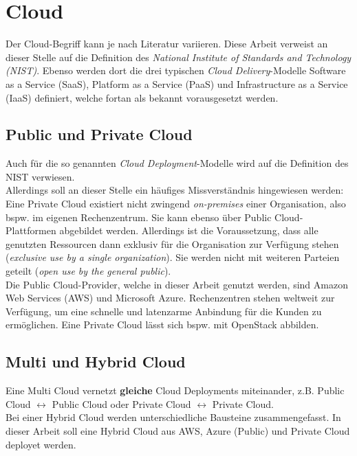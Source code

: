 \section{Cloud}\label{cloud}
Der Cloud-Begriff kann je nach Literatur variieren. Diese Arbeit verweist an dieser Stelle auf die Definition des \textit{National Institute of Standards and Technology (NIST)}. Ebenso werden dort die drei typischen \textit{Cloud Delivery}-Modelle Software as a Service (SaaS), Platform as a Service (PaaS) und Infrastructure as a Service (IaaS) definiert, welche fortan als bekannt vorausgesetzt werden.\cite{mell2011}

\subsection{Public und Private Cloud}
Auch für die so genannten \textit{Cloud Deployment}-Modelle wird auf die Definition des NIST verwiesen.\cite{mell2011}\\
Allerdings soll an dieser Stelle ein häufiges Missverständnis hingewiesen werden: Eine Private Cloud existiert nicht zwingend \textit{on-premises} einer Organisation, also bspw. im eigenen Rechenzentrum. Sie kann ebenso über Public Cloud-Plattformen abgebildet werden. Allerdings ist die Voraussetzung, dass alle genutzten Ressourcen dann exklusiv für die Organisation zur Verfügung stehen (\textit{exclusive use by a single organization}). Sie werden nicht mit weiteren Parteien geteilt (\textit{open use by the general public}).\\
Die Public Cloud-Provider, welche in dieser Arbeit genutzt werden, sind Amazon Web Services (AWS) und Microsoft Azure. Rechenzentren stehen weltweit zur Verfügung, um eine schnelle und latenzarme Anbindung für die Kunden zu ermöglichen. Eine Private Cloud lässt sich bspw. mit OpenStack abbilden\cite{sefraoui2012openstack}.

\subsection{Multi und Hybrid Cloud}
Eine Multi Cloud vernetzt \textbf{gleiche} Cloud Deployments miteinander, z.B. Public Cloud 	$\leftrightarrow$ Public Cloud oder Private Cloud $\leftrightarrow$ Private Cloud.\\
Bei einer Hybrid Cloud werden unterschiedliche Bausteine zusammengefasst. In dieser Arbeit soll eine Hybrid Cloud aus AWS, Azure (Public) und Private Cloud deployet werden.

